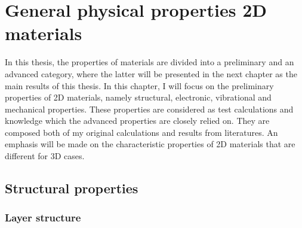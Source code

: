
\chapter{General physical properties 2D materials \label{chap:3}}

\ifpdf
    \graphicspath{{Chapter3/Figs/Raster/}{Chapter3/Figs/PDF/}{Chapter3/Figs/}{Chapter3/Figs/Vector/}}
\else
    \graphicspath{{Chapter3/Figs/Vector/}{Chapter3/Figs/}}
\fi

In this thesis, the properties of materials are divided into a preliminary and an advanced category, where the latter will be presented in the next chapter as the main results of this thesis. In this chapter, I will focus on the preliminary properties of 2D materials, namely structural, electronic, vibrational and mechanical properties. These properties are considered as test calculations and knowledge which the advanced properties are closely relied on. They are composed both of my original calculations and results from literatures. An emphasis will be made on the characteristic properties of 2D materials that are different for 3D cases.

\section{Structural properties}
\subsection{Layer structure}

